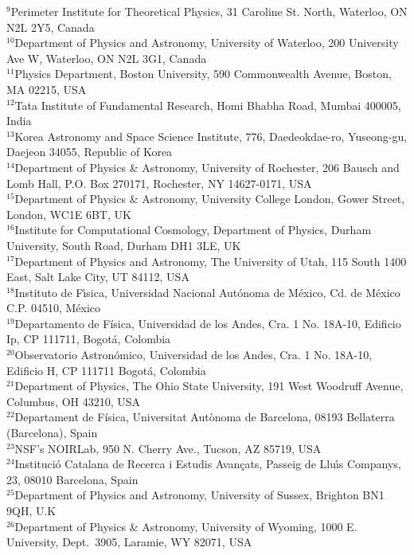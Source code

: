 {$^{9}$Perimeter Institute for Theoretical Physics, 31 Caroline St. North, Waterloo, ON N2L 2Y5, Canada\\ 
$^{10}$Department of Physics and Astronomy, University of Waterloo, 200 University Ave W, Waterloo, ON N2L 3G1, Canada\\ 
$^{11}$Physics Department, Boston University, 590 Commonwealth Avenue, Boston, MA 02215, USA\\ 
$^{12}$Tata Institute of Fundamental Research, Homi Bhabha Road, Mumbai 400005, India\\ 
$^{13}$Korea Astronomy and Space Science Institute, 776, Daedeokdae-ro, Yuseong-gu, Daejeon 34055, Republic of Korea\\ 
$^{14}$Department of Physics \& Astronomy, University of Rochester, 206 Bausch and Lomb Hall, P.O. Box 270171, Rochester, NY 14627-0171, USA\\ 
$^{15}$Department of Physics \& Astronomy, University College London, Gower Street, London, WC1E 6BT, UK\\ 
$^{16}$Institute for Computational Cosmology, Department of Physics, Durham University, South Road, Durham DH1 3LE, UK\\ 
$^{17}$Department of Physics and Astronomy, The University of Utah, 115 South 1400 East, Salt Lake City, UT 84112, USA\\ 
$^{18}$Instituto de F\'{\i}sica, Universidad Nacional Aut\'{o}noma de M\'{e}xico,  Cd. de M\'{e}xico  C.P. 04510,  M\'{e}xico\\ 
$^{19}$Departamento de F\'isica, Universidad de los Andes, Cra. 1 No. 18A-10, Edificio Ip, CP 111711, Bogot\'a, Colombia\\ 
$^{20}$Observatorio Astron\'omico, Universidad de los Andes, Cra. 1 No. 18A-10, Edificio H, CP 111711 Bogot\'a, Colombia\\ 
$^{21}$Department of Physics, The Ohio State University, 191 West Woodruff Avenue, Columbus, OH 43210, USA\\ 
$^{22}$Departament de F\'{i}sica, Universitat Aut\`{o}noma de Barcelona, 08193 Bellaterra (Barcelona), Spain\\ 
$^{23}$NSF's NOIRLab, 950 N. Cherry Ave., Tucson, AZ 85719, USA\\ 
$^{24}$Instituci\'{o} Catalana de Recerca i Estudis Avan\c{c}ats, Passeig de Llu\'{\i}s Companys, 23, 08010 Barcelona, Spain\\ 
$^{25}$Department of Physics and Astronomy, University of Sussex, Brighton BN1 9QH, U.K\\ 
$^{26}$Department of Physics \& Astronomy, University  of Wyoming, 1000 E. University, Dept.~3905, Laramie, WY 82071, USA\\ 
}
